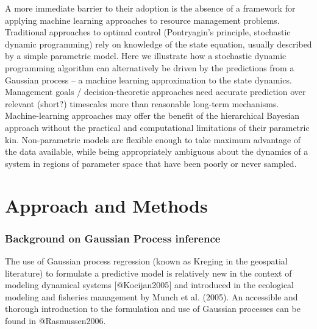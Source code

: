\documentclass[author-year, review]{elsarticle} %
\begin{document}
A more immediate barrier to their adoption is the absence of a framework
for applying machine learning approaches to resource management
problems. Traditional approaches to optimal control (Pontryagin's
principle, stochastic dynamic programming) rely on knowledge of the
state equation, usually described by a simple parametric model. Here we
illustrate how a stochastic dynamic programming algorithm can
alternatively be driven by the predictions from a Gaussian process -- a
machine learning approximation to the state dynamics.\\

Management goals / decision-theoretic approaches need accurate
prediction over relevant (short?) timescales more than reasonable
long-term mechanisms. Machine-learning approaches may offer the benefit
of the hierarchical Bayesian approach without the practical and
computational limitations of their parametric kin. Non-parametric models
are flexible enough to take maximum advantage of the data available,
while being appropriately ambiguous about the dynamics of a system in
regions of parameter space that have been poorly or never sampled.

\section{Approach and Methods}

\subsubsection{Background on Gaussian Process inference}

The use of Gaussian process regression (known as Kreging in the
geospatial literature) to formulate a predictive model is relatively new
in the context of modeling dynamical systems {[}@Kocijan2005{]} and
introduced in the ecological modeling and fisheries management by Munch
et al. (2005). An accessible and thorough introduction to the
formulation and use of Gaussian processes can be found in
@Rasmussen2006.
\end{document}
